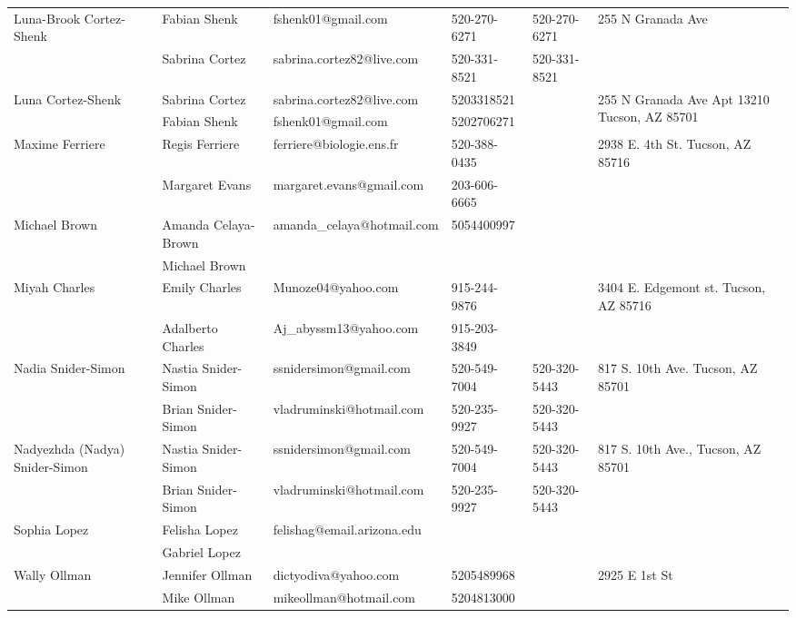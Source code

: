 \documentclass[landscape]{article}\usepackage[]{graphicx}\usepackage[]{color}
\begin{document}
\begin{longtable}{|p{100pt}|p{100pt}|p{140pt}|p{60pt}|p{64pt}|p{120pt}|}
\hline
\multirow{2}{100pt}{Luna-Brook Cortez-Shenk} & Fabian Shenk & fshenk01@gmail.com & 520-270-6271 & 520-270-6271 & \multirow{2}{120pt}{255 N Granada Ave} \\
 & Sabrina Cortez & sabrina.cortez82@live.com & 520-331-8521 & 520-331-8521 & \\
\hline
\multirow{2}{100pt}{Luna Cortez-Shenk} & Sabrina Cortez & sabrina.cortez82@live.com & 5203318521 &  & \multirow{2}{120pt}{255 N Granada Ave Apt 13210 Tucson, AZ 85701} \\
 & Fabian Shenk & fshenk01@gmail.com & 5202706271 &  & \\
\hline
\multirow{2}{100pt}{Maxime Ferriere} & Regis Ferriere & ferriere@biologie.ens.fr & 520-388-0435 &  & \multirow{2}{120pt}{2938 E. 4th St. Tucson, AZ 85716} \\
 & Margaret Evans & margaret.evans@gmail.com & 203-606-6665 &  & \\
\hline
\multirow{2}{100pt}{Michael Brown} & Amanda Celaya-Brown & amanda\_celaya@hotmail.com & 5054400997 &  & \multirow{2}{120pt}{} \\
 & Michael Brown &  &  &  & \\
\hline
\multirow{2}{100pt}{Miyah Charles} & Emily Charles & Munoze04@yahoo.com & 915-244-9876 &  & \multirow{2}{120pt}{3404 E. Edgemont st. Tucson, AZ 85716} \\
 & Adalberto Charles & Aj\_abyssm13@yahoo.com & 915-203-3849 &  & \\
\hline
\multirow{2}{100pt}{Nadia Snider-Simon} & Nastia Snider-Simon & ssnidersimon@gmail.com & 520-549-7004 & 520-320-5443 & \multirow{2}{120pt}{817 S. 10th Ave. Tucson, AZ 85701} \\
 & Brian Snider-Simon & vladruminski@hotmail.com & 520-235-9927 & 520-320-5443 & \\
\hline
\multirow{2}{100pt}{Nadyezhda (Nadya) Snider-Simon} & Nastia Snider-Simon & ssnidersimon@gmail.com & 520-549-7004 & 520-320-5443 & \multirow{2}{120pt}{817 S. 10th Ave., Tucson, AZ 85701} \\
 & Brian Snider-Simon & vladruminski@hotmail.com & 520-235-9927 & 520-320-5443 & \\
\hline
\multirow{2}{100pt}{Sophia Lopez} & Felisha Lopez & felishag@email.arizona.edu &  &  & \multirow{2}{120pt}{} \\
 & Gabriel Lopez &  &  &  & \\
\hline
\multirow{2}{100pt}{Wally Ollman} & Jennifer Ollman & dictyodiva@yahoo.com & 5205489968 &  & \multirow{2}{120pt}{2925 E 1st St} \\
 & Mike Ollman & mikeollman@hotmail.com & 5204813000 &  & \\
\hline
\end{longtable}
\newpage
\end{document}
